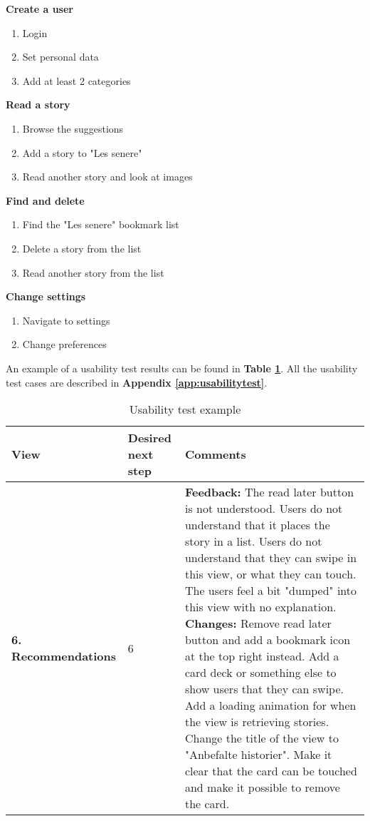 \textbf{Create a user} 	
	\begin{enumerate}
		\item Login 
		\item Set personal data 
		\item Add at least 2 categories 
	\end{enumerate}
\textbf{Read a story} 
	\begin{enumerate}
		\item Browse the suggestions 
		\item Add a story to "Les senere" 
		\item Read another story and look at images 
	\end{enumerate}
\textbf{Find and delete }
	\begin{enumerate}
		\item Find the "Les senere" bookmark list
		\item Delete a story from the list
		\item Read another story from the list 
	\end{enumerate}
 \textbf{Change settings}
	\begin{enumerate}
		\item Navigate to settings 
		\item Change preferences 
	\end{enumerate}
	


An example of a usability test results can be found in \textbf{Table \ref{Tab:usabilityTestexample}}. All the usability test cases are described in \textbf{Appendix \ref{app:usabilitytest}}.

\begin{table}[H]
\begin{center}
	\caption{Usability test example }
	\label{Tab:usabilityTestexample}
	\begin{tabular}{ | p{2cm} | p{2cm} | p{13cm}|}	
		\hline
		\textbf{View} & \textbf{Desired next step} & \textbf{Comments}
		\\ \hline
		
		\textbf{6. Recommendations} & 6 & 
		\textbf{Feedback:} The read later button is not understood. Users do not understand that it places the story in a list. Users do not understand that they can swipe in this view, or what they can touch. The users feel a bit "dumped" into this view with no explanation.\newline
		\textbf{Changes:} Remove read later button and add a bookmark icon at the top right instead. Add a card deck or something else to show users that they can swipe. Add a loading animation for when the view is retrieving stories. Change the title of the view to "Anbefalte historier". Make it clear that the card can be touched and make it possible to remove the card.
		\\\hline
	\end{tabular}
\end{center}
\end{table}
	

